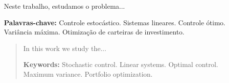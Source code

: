 \begin{resumo}

Neste trabalho, estudamos o problema...

\vspace{1\baselineskip}

\textbf{Palavras-chave:} Controle estoc\' astico. Sistemas lineares. Controle \' otimo. Vari\^ ancia m\' axima. Otimiza\c c\~ao de carteiras de investimento.

\end{resumo}


\begin{abstract}

In this work we study the...

\vspace{1\baselineskip}

\textbf{Keywords:} Stochastic control. Linear systems. Optimal control. Maximum variance. Portfolio optimization.

\end{abstract}
